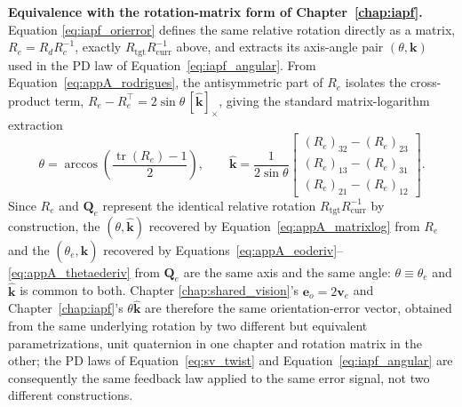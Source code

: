 \textbf{Equivalence with the rotation-matrix form of Chapter~\ref{chap:iapf}.} Equation
\eqref{eq:iapf_orierror} defines the same relative rotation directly as a matrix, $R_e = R_d
R_c^{-1}$, exactly $R_{\text{tgt}}R_{\text{curr}}^{-1}$ above, and extracts its axis-angle pair
$(\theta, \mathbf{k})$ used in the PD law of Equation~\eqref{eq:iapf_angular}. From
Equation~\eqref{eq:appA_rodrigues}, the antisymmetric part of $R_e$ isolates the cross-product term,
$R_e - R_e^\top = 2\sin\theta\,[\hat{\mathbf{k}}]_\times$, giving the standard matrix-logarithm
extraction
\begin{equation}
\theta = \arccos\!\left( \frac{\operatorname{tr}(R_e)-1}{2} \right), \qquad
\hat{\mathbf{k}} = \frac{1}{2\sin\theta}
\begin{bmatrix} (R_e)_{32}-(R_e)_{23} \\ (R_e)_{13}-(R_e)_{31} \\ (R_e)_{21}-(R_e)_{12} \end{bmatrix}.
\label{eq:appA_matrixlog}
\end{equation}
Since $R_e$ and $\mathbf{Q}_e$ represent the identical relative rotation $R_{\text{tgt}}R_{\text{curr}}^{-1}$
by construction, the $(\theta, \hat{\mathbf{k}})$ recovered by Equation~\eqref{eq:appA_matrixlog}
from $R_e$ and the $(\theta_e, \hat{\mathbf{k}})$ recovered by
Equations~\eqref{eq:appA_eoderiv}--\eqref{eq:appA_thetaederiv} from $\mathbf{Q}_e$ are the same
axis and the same angle: $\theta \equiv \theta_e$ and $\hat{\mathbf{k}}$ is common to both. Chapter
\ref{chap:shared_vision}'s $\mathbf{e}_o = 2\mathbf{v}_e$ and Chapter~\ref{chap:iapf}'s
$\theta\hat{\mathbf{k}}$ are therefore the same orientation-error vector, obtained from the same
underlying rotation by two different but equivalent parametrizations, unit quaternion in one chapter
and rotation matrix in the other; the PD laws of Equation~\eqref{eq:sv_twist} and
Equation~\eqref{eq:iapf_angular} are consequently the same feedback law applied to the same error
signal, not two different constructions.


